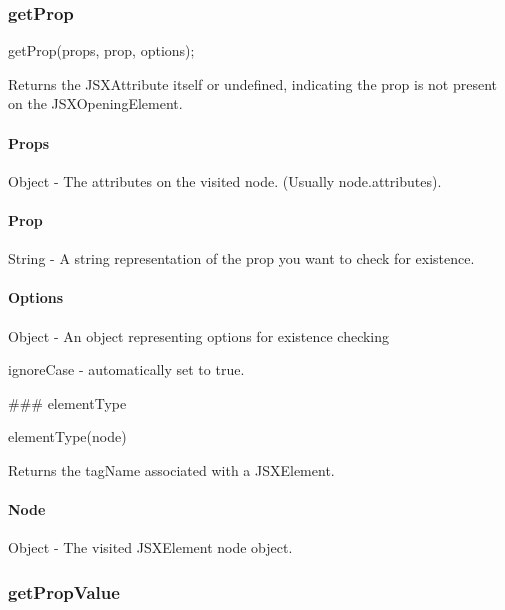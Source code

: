 \subsubsection*{get\+Prop}


\begin{DoxyCode}
getProp(props, prop, options);
\end{DoxyCode}
 Returns the J\+S\+X\+Attribute itself or undefined, indicating the prop is not present on the J\+S\+X\+Opening\+Element.

\paragraph*{Props}

Object -\/ The attributes on the visited node. (Usually {\ttfamily node.\+attributes}). \paragraph*{Prop}

String -\/ A string representation of the prop you want to check for existence. \paragraph*{Options}

Object -\/ An object representing options for existence checking
\begin{DoxyEnumerate}
\item {\ttfamily ignore\+Case} -\/ automatically set to {\ttfamily true}.
\end{DoxyEnumerate}





\#\#\# element\+Type 
\begin{DoxyCode}
elementType(node)
\end{DoxyCode}
 Returns the tag\+Name associated with a J\+S\+X\+Element.

\paragraph*{Node}

Object -\/ The visited J\+S\+X\+Element node object.





\subsubsection*{get\+Prop\+Value}


